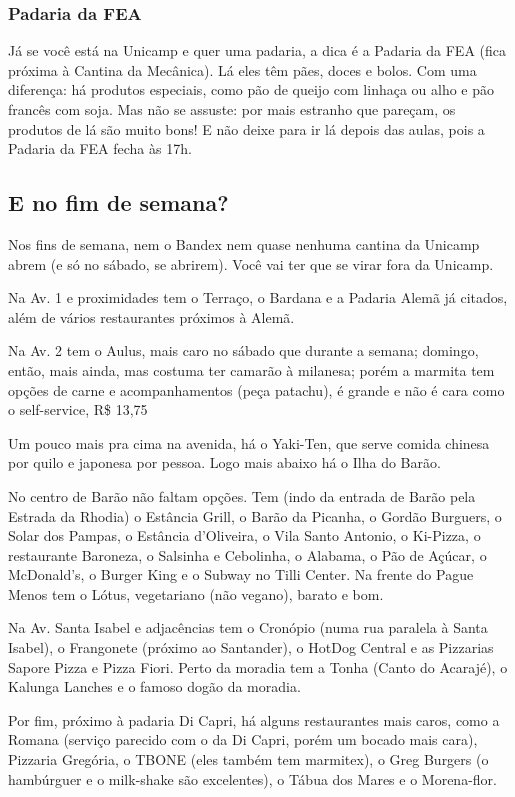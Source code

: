 \subsubsection{Padaria da FEA}

Já se você está na Unicamp e quer uma padaria, a dica é a Padaria da FEA (fica
próxima à Cantina da Mecânica). Lá eles têm pães, doces e bolos. Com uma
diferença: há produtos especiais, como pão de queijo com linhaça ou alho e pão
francês com soja. Mas não se assuste: por mais estranho que pareçam, os produtos
de lá são muito bons! E não deixe para ir lá depois das aulas, pois a Padaria da
FEA fecha às 17h.

\subsection{E no fim de semana?}

Nos fins de semana, nem o Bandex nem quase nenhuma cantina da Unicamp abrem (e
só no sábado, se abrirem). Você vai ter que se virar fora da Unicamp.

Na Av. 1 e proximidades tem o Terraço, o Bardana e a Padaria Alemã já citados,
além de vários restaurantes próximos à Alemã.

Na Av. 2 tem o Aulus, mais caro no sábado que durante a semana; domingo, então,
mais ainda, mas costuma ter camarão à milanesa; porém a marmita tem opções de
carne e acompanhamentos (peça patachu), é grande e não é cara como o
self-service, R\$ 13,75

Um pouco mais pra cima na avenida, há o Yaki-Ten, que serve comida chinesa por
quilo e japonesa por pessoa.  Logo mais abaixo há o Ilha do Barão.

No centro de Barão não faltam opções. Tem (indo da entrada de Barão pela Estrada
da Rhodia) o Estância Grill, o Barão da Picanha, o Gordão Burguers, o Solar dos
Pampas, o Estância d'Oliveira, o Vila Santo Antonio, o Ki-Pizza, o restaurante
Baroneza, o Salsinha e Cebolinha, o Alabama, o Pão de Açúcar, o McDonald's, o
Burger King e o Subway no Tilli Center. Na frente do Pague Menos tem o Lótus,
vegetariano (não vegano), barato e bom.

Na Av.  Santa Isabel e adjacências tem o Cronópio (numa rua paralela à Santa
Isabel), o Frangonete (próximo ao Santander), o HotDog Central e as Pizzarias
Sapore Pizza e Pizza Fiori. Perto da moradia tem a Tonha (Canto do Acarajé), o
Kalunga Lanches e o famoso dogão da moradia.

Por fim, próximo à padaria Di Capri, há alguns restaurantes mais caros, como a
Romana (serviço parecido com o da Di Capri, porém um bocado mais cara), Pizzaria
Gregória, o TBONE (eles também tem marmitex), o Greg Burgers (o hambúrguer e o
milk-shake são excelentes), o Tábua dos Mares e o Morena-flor.

